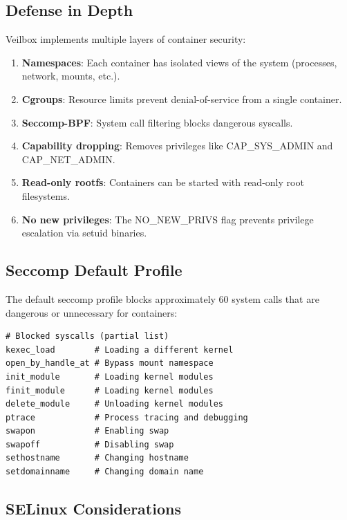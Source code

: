 \subsection{Defense in Depth}

Veilbox implements multiple layers of container security:

\begin{enumerate}[nosep]
  \item \textbf{Namespaces}: Each container has isolated views of the
        system (processes, network, mounts, etc.).
  \item \textbf{Cgroups}: Resource limits prevent denial-of-service
        from a single container.
  \item \textbf{Seccomp-BPF}: System call filtering blocks dangerous
        syscalls.
  \item \textbf{Capability dropping}: Removes privileges like
        CAP\_SYS\_ADMIN and CAP\_NET\_ADMIN.
  \item \textbf{Read-only rootfs}: Containers can be started with
        read-only root filesystems.
  \item \textbf{No new privileges}: The NO\_NEW\_PRIVS flag prevents
        privilege escalation via setuid binaries.
\end{enumerate}

\subsection{Seccomp Default Profile}

The default seccomp profile blocks approximately 60 system calls that
are dangerous or unnecessary for containers:

\begin{lstlisting}
# Blocked syscalls (partial list)
kexec_load        # Loading a different kernel
open_by_handle_at # Bypass mount namespace
init_module       # Loading kernel modules
finit_module      # Loading kernel modules
delete_module     # Unloading kernel modules
ptrace            # Process tracing and debugging
swapon            # Enabling swap
swapoff           # Disabling swap
sethostname       # Changing hostname
setdomainname     # Changing domain name
\end{lstlisting}

\subsection{SELinux Considerations}

